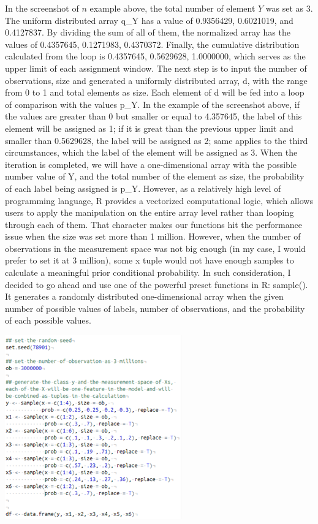 \documentclass{article}
\begin{document}
\begin{multicols}{2}
In the screenshot of $n$ example above, the total number of element $Y$ was set as 3. The uniform distributed array q\_Y has a value of 0.9356429, 0.6021019, and 0.4127837. By dividing the sum of all of them, the normalized array has the values of 0.4357645, 0.1271983, 0.4370372. Finally, the cumulative distribution calculated from the loop is 0.4357645, 0.5629628, 1.0000000, which serves as the upper limit of each assignment window.
The next step is to input the number of observations, size and generated a uniformly distributed array, d, with the range from 0 to 1 and total elements as size.
Each element of d will be fed into a loop of comparison with the values p\_Y. In the example of the screenshot above, if the values are greater than 0 but smaller or equal to 4.357645, the label of this element will be assigned as 1; if it is great than the previous upper limit and smaller than 0.5629628, the label will be assigned as 2; same applies to the third circumstances, which the label of the element will be assigned as 3.
When the iteration is completed, we will have a one-dimensional array with the possible number value of Y, and the total number of the element as size, the probability of each label being assigned is p\_Y.
However, as a relatively high level of programming language, R provides a vectorized computational logic, which allows users to apply the manipulation on the entire array level rather than looping through each of them. That character makes our functions hit the performance issue when the size was set more than 1 million. However, when the number of observations in the measurement space was not big enough (in my case, I would prefer to set it at 3 million), some x tuple would not have enough samples to calculate a meaningful prior conditional probability. In such consideration, I decided to go ahead and use one of the powerful preset functions in R: sample(). It generates a randomly distributed one-dimensional array when the given number of possible values of labels, number of observations, and the probability of each possible values. 

\includegraphics{fig2.png}


\end{multicols}
\end{document}

